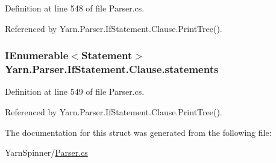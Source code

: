 Definition at line 548 of file Parser.\-cs.



Referenced by Yarn.\-Parser.\-If\-Statement.\-Clause.\-Print\-Tree().

\hypertarget{a00050_a6f4765482e98ed042e38a0ede13f171f}{
\subsubsection[{statements}]{\setlength{\rightskip}{0pt plus 5cm}I\-Enumerable$<${\bf Statement}$>$ Yarn.\-Parser.\-If\-Statement.\-Clause.\-statements\hspace{0.3cm}{\ttfamily [package]}}}\label{a00050_a6f4765482e98ed042e38a0ede13f171f}


Definition at line 549 of file Parser.\-cs.



Referenced by Yarn.\-Parser.\-If\-Statement.\-Clause.\-Print\-Tree().



The documentation for this struct was generated from the following file\-:\begin{DoxyCompactItemize}
\item 
Yarn\-Spinner/\hyperlink{a00313}{Parser.\-cs}\end{DoxyCompactItemize}
